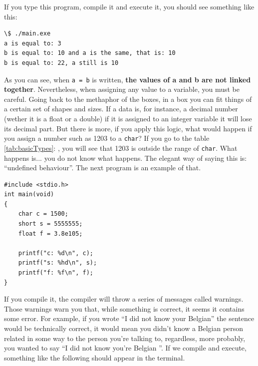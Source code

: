 \documentclass[a4paper]{article}
\begin{document}
If you type this program, compile it and execute it, you should see something
like this:

\noindent
\begin{minipage}[H]{\linewidth}
\mbox{}
\begin{lstlisting}[style=terminalStyle]
\$ ./main.exe
a is equal to: 3
b is equal to: 10 and a is the same, that is: 10
b is equal to: 22, a still is 10
\end{lstlisting}
\end{minipage}

As you can see, when \verb!a = b! is written, \textbf{the values of a and b are
not linked together}. Nevertheless, when assigning any value to a variable, you
must be careful. Going back to the methaphor of the boxes, in a box you can fit
things of a certain set of shapes and sizes. If a data is, for instance, a
decimal number (wether it is a float or a double) if it is assigned to an
integer variable it will lose its decimal part. But there is more, if you apply
this logic, what would happen if you assign a number such as 1203 to a
\verb!char!? If you go to the table \ref{tab:basicTypes}:
, you will see that 1203 is outside the range of
\verb!char!. What happens is... you do not know what happens. The elegant way of
saying this is: ``undefined behaviour''. The next program is an example of that.


\noindent
\begin{minipage}[H]{\linewidth}
\mbox{}
\begin{lstlisting}[style=C, caption={Erroneous assignments},
label={lst:invalidAssignations}]
#include <stdio.h>
int main(void)
{
    char c = 1500;
    short s = 5555555;
    float f = 3.8e105;

    printf("c: %d\n", c);
    printf("s: %hd\n", s);
    printf("f: %f\n", f);
}
\end{lstlisting}
\end{minipage}

If you compile it, the compiler will throw a series of messages called warnings.
Those warnings warn you that, while something is correct, it seems it contains
some error. For example, if you wrote ``I did not know your Belgian'' the
sentence would be technically correct, it would mean you didn't know a Belgian
person related in some way to the person you're talking to, regardless, more
probably, you wanted to say  ``I did not know you're Belgian ''. If we compile
and execute, something like the following should appear in the terminal.
\end{document}
